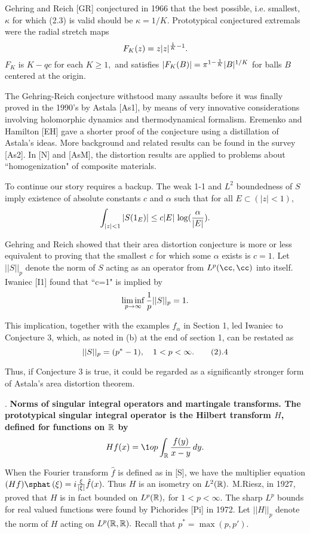 Gehring and Reich [GR] conjectured in 1966 that the best possible, i.e. 
smallest, $\kappa$ for which (2.3) is valid should be $\kappa = 1/K.$ 
Prototypical conjectured extremals were the radial stretch maps  
$$F_K(z) = z|z|^{{1\over K}-1}.$$ 
$F_K$ is $K-qc$ for each $ K\geq1,$ and satisfies $ |F_K(B)| 
=  {\pi}^{1-{1\over K}} |B|^{1/K}$ for balls $B$ centered at the origin.  

The Gehring-Reich conjecture withstood many assaults before it was 
finally proved in the 1990's by Astala [As1], by means of 
very innovative considerations involving holomorphic dynamics 
and thermodynamical formalism. Eremenko and Hamilton [EH] gave a shorter proof 
of the conjecture using a distillation of Astala's ideas. More background and 
related results can be found in the survey [As2].  In [N] and [AsM], the 
distortion results are applied to problems about ``homogenization" of composite 
materials. 

To continue our story requires a backup. The weak 1-1 and $L^2$ boundedness of 
$S$ imply existence of absolute constants $c$ and $\alpha$ such that for 
all $E\subset (|z| < 1),$ 
$$\int_{|z|<1}|S(1_E)| \leq c |E|\,\log({{\alpha}\over {|E|}}). $$

Gehring and Reich showed that their area distortion conjecture is more or less 
equivalent to  
proving that the smallest $c$ for which some $\alpha$ exists is $c = 1.$ Let 
$||S||_p$ denote the norm of $S$  
acting as an operator from $L^p(\cc, \cc)$ into itself. Iwaniec [I1]
found that ``c=1" is implied by 
$$\liminf_{p\rightarrow \infty}{1\over p}||S||_p  = 1.$$

This implication, together with the examples $f_{\alpha}$ in Section 1,
led Iwaniec to Conjecture 3, which, as noted in (b) at the 
end of section 1, can be restated as  
 $$||S||_p = (p^*-1),\quad 1<p<\infty. \tag2.4$$  

Thus, if Conjecture 3 is true, it could be regarded as a significantly stronger  
form of Astala's area distortion theorem.  \bigskip

. \bf Norms of singular integral operators and martingale 
transforms.  \rm The 
prototypical singular integral operator is the Hilbert transform $H$, defined 
for functions on $\Bbb R$ by $$  Hf(x) = \1op \int_{\rr} {{f(y)}\over {x-
y}}\,dy.$$ 

When the Fourier transform $\hat f$ is defined as in [S], we have the 
multiplier equation  $(Hf)\sphat \,(\xi) =  
i{{\xi}\over {|\xi |}} \hat f(x).$ Thus $H$ is an isometry on $L^2(\Bbb R).$ 
M.Riesz, in 1927, proved that $H$ is in fact bounded on $L^p(\Bbb R),$ for 
$1<p<\infty.$ The sharp $L^p$ bounds for real valued functions were found by 
Pichorides [Pi] in 1972. Let $||H||_p$ denote the norm of $H$ acting on 
$L^p(\Bbb R, \Bbb R).$ Recall that $p^* = \max (p, p').$

